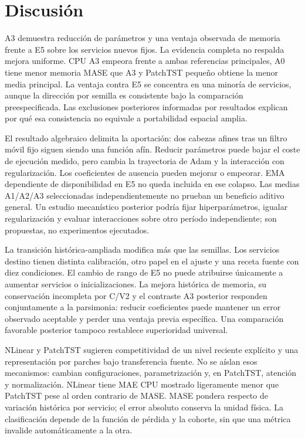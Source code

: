 \section{Discusión}\label{sec:discussion}
A3 demuestra reducción de parámetros y una ventaja observada de memoria frente a E5 sobre los servicios nuevos fijos. La evidencia completa no respalda mejora uniforme. CPU A3 empeora frente a ambas referencias principales, A0 tiene menor memoria MASE que A3 y PatchTST pequeño obtiene la menor media principal. La ventaja contra E5 se concentra en una minoría de servicios, aunque la dirección por semilla es consistente bajo la comparación preespecificada. Las exclusiones posteriores informadas por resultados explican por qué esa consistencia no equivale a portabilidad espacial amplia.

El resultado algebraico delimita la aportación: dos cabezas afines tras un filtro móvil fijo siguen siendo una función afín. Reducir parámetros puede bajar el coste de ejecución medido, pero cambia la trayectoria de Adam y la interacción con regularización. Los coeficientes de ausencia pueden mejorar o empeorar. EMA dependiente de disponibilidad en E5 no queda incluida en ese colapso. Las medias A1/A2/A3 seleccionadas independientemente no prueban un beneficio aditivo general. Un estudio mecanístico posterior podría fijar hiperparámetros, igualar regularización y evaluar interacciones sobre otro período independiente; son propuestas, no experimentos ejecutados.

La transición histórica-ampliada modifica más que las semillas. Los servicios destino tienen distinta calibración, otro papel en el ajuste y una receta fuente con diez condiciones. El cambio de rango de E5 no puede atribuirse únicamente a aumentar servicios o inicializaciones. La mejora histórica de memoria, su conservación incompleta por C/V2 y el contraste A3 posterior responden conjuntamente a la parsimonia: reducir coeficientes puede mantener un error observado aceptable y perder una ventaja previa específica. Una comparación favorable posterior tampoco restablece superioridad universal.

NLinear y PatchTST sugieren competitividad de un nivel reciente explícito y una representación por parches bajo transferencia fuente. No se aíslan esos mecanismos: cambian configuraciones, parametrización y, en PatchTST, atención y normalización. NLinear tiene MAE CPU mostrado ligeramente menor que PatchTST pese al orden contrario de MASE. MASE pondera respecto de variación histórica por servicio; el error absoluto conserva la unidad física. La clasificación depende de la función de pérdida y la cohorte, sin que una métrica invalide automáticamente a la otra.

